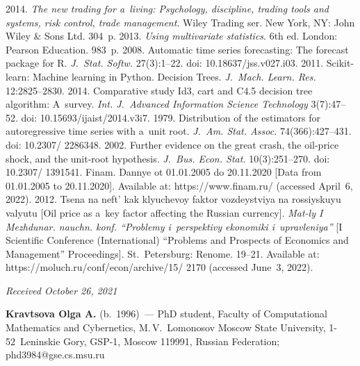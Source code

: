 \begin{multicols}{2}
{{\begin{thebibliography}{99}
 2014. \textit{The new trading for a~living: Psychology, discipline, trading tools and systems, 
risk control, trade management}. 
Wiley Trading ser.
New York, NY: John Wiley \& Sons Ltd. 304~p.
2013. \textit{Using multivariate statistics}. 6th ed. London: Pearson Education. 983~p.
 2008. Automatic time series forecasting: The forecast package for 
R. \textit{J.~Stat. Softw.} 27(3):1--22. doi: 10.18637/jss.v027.i03.
 2011. Scikit-learn: Machine learning in Python. Decision Trees. 
 \textit{J.~Mach. Learn. Res.} 12:2825--2830.
 2014. Comparative study Id3, cart and C4.5 decision tree algorithm: A~survey. 
 \textit{Int. J.~Advanced Information Science Technology} 3(7):47--52. doi: 10.15693/ijaist/2014.v3i7.
 1979. Distribution of the estimators for autoregressive time series with a~unit root. 
 \textit{J.~Am. Stat. Assoc.} 74(366):427--431. doi: 10.2307/ 2286348.
 2002. Further evidence on the great crash, the oil-price shock,
 and the unit-root hypothesis. \textit{J.~Bus. Econ. Stat.} 10(3):251--270. 
 doi: 10.2307/ 1391541.
Finam. Dannye ot 01.01.2005 do 20.11.2020 [Data from 01.01.2005 to 20.11.2020]. Available at: 
{\sf https://www.\linebreak finam.ru/} (accessed April~6, 2022). 
 2012. Tsena na neft' kak klyuchevoy faktor vozdeystviya na rossiyskuyu valyutu 
[Oil price as a~key factor affecting the Russian currency]. 
\textit{Mat-ly I Mezhdunar. nauchn. konf. ``Problemy i~perspektivy ekonomiki i~upravleniya''}
 [I Scientific Conference (International) ``Problems and Prospects of Economics and Management'' Proceedings]. 
 St.\ Petersburg: Renome. 19--21. Available at: 
 {\sf  https://moluch.ru/conf/econ/archive/15/ 2170} (accessed June~3, 2022).
 \end{thebibliography}

 }
 }

\end{multicols}

\vspace*{-6pt}

\hfill{\small\textit{Received October 26, 2021}}

\Contrl

\noindent
\textbf{Kravtsova Olga A.} (b.\ 1996)~--- 
PhD student, Faculty of Computational Mathematics and Cybernetics, M.\,V.~Lomonosov Moscow State University, 
1-52~Leninskie Gory, GSP-1, Moscow 119991, Russian Federation; \mbox{phd3984@gse.cs.msu.ru}



   

\label{end\stat}

\renewcommand{\bibname}{\protect\rm Литература}    